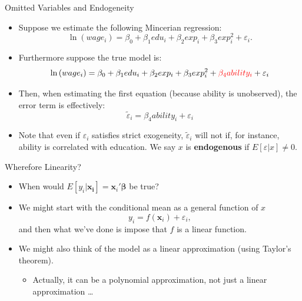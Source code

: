 \documentclass[english,xcolor={dvipsnames},aspectratio=169]{beamer}
\begin{document}
\begin{frame}{Omitted Variables and Endogeneity}
\begin{itemize}
	\item Suppose we estimate the following Mincerian regression:\[
\ln \left(wage_{i}\right)=\beta_{0}+\beta_{1}edu_{i}+\beta_{2}exp_{i}+\beta_{3}exp_{i}^{2}+\varepsilon_{i}.
\]

	\item Furthermore suppose the true model is:\[
\ln \left(wage_{i}\right)=\beta_{0}+\beta_{1}edu_{i}+\beta_{2}exp_{i}+\beta_{3}exp_{i}^{2}+ \textcolor{red}{\beta_4 ability_{i}} + \varepsilon_{i}
\]

	\item Then, when estimating the first equation (because ability is unobserved), the error term is effectively:\[
	\widetilde{\varepsilon}_{i} = \beta_4 ability_{i} + \varepsilon_{i}
\]


\item Note that even if $\varepsilon_{i}$ satisfies strict exogeneity, $\widetilde{\varepsilon}_{i}$ will not
 	if, for instance, ability is correlated with education. We say $x$ is {\bf endogenous} if $E\left[\varepsilon|x\right]\ne 0$.


\end{itemize}
\end{frame}



\begin{frame}{Wherefore Linearity?}
\begin{itemize}
	\item When would $E\left[y_i|\boldsymbol{x_i}\right] = \boldsymbol{x}_i'\boldsymbol{\beta}$ be true?

	\medskip
	\item We might start with the conditional mean as a general function of $x$\[
	 y_{i} = f\left(\boldsymbol{x}_{i}\right)+\varepsilon_{i},
	\]
	and then what we've done is impose that $f$ is a linear function. 

		\medskip
	\item We might also think of the model as a linear approximation (using Taylor's theorem). 
	\begin{itemize}
		\item Actually, it can be a polynomial approximation, not just a linear approximation \dots
	\end{itemize}
\end{itemize}
\end{frame}
\end{document}
